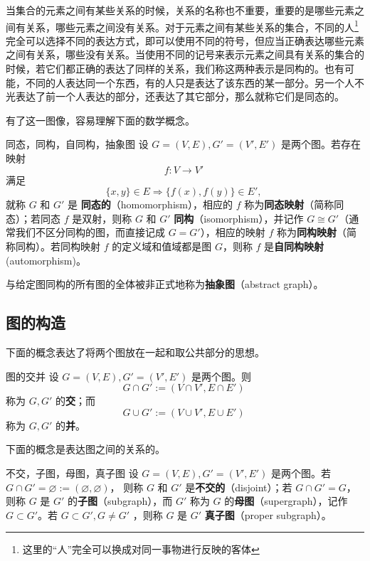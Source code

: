 当集合的元素之间有某些关系的时候，关系的名称也不重要，重要的是哪些元素之间有关系，哪些元素之间没有关系。对于元素之间有某些关系的集合，不同的人\footnote{这里的“人”完全可以换成对同一事物进行反映的客体}完全可以选择不同的表达方式，即可以使用不同的符号，但应当正确表达哪些元素之间有关系，哪些没有关系。当使用不同的记号来表示元素之间具有关系的集合的时候，若它们都正确的表达了同样的关系，我们称这两种表示是同构的。也有可能，不同的人表达同一个东西，有的人只是表达了该东西的某一部分。另一个人不光表达了前一个人表达的部分，还表达了其它部分，那么就称它们是同态的。

有了这一图像，容易理解下面的数学概念。
\begin{definition}{同态，同构，自同构，抽象图}
设 $G=(V,E),G'=(V',E')$ 是两个图。若存在映射
\begin{equation}
f:V\rightarrow V'~
\end{equation}
满足
\begin{equation}
\{x,y\}\in E\Rightarrow \{f(x),f(y)\}\in E',~
\end{equation}
就称 $G$ 和 $G'$ 是 \textbf{同态的}（homomorphism），相应的 $f$ 称为\textbf{同态映射}（简称同态）；若同态 $f$ 是双射，则称 $G$ 和 $G'$ \textbf{同构}（isomorphism），并记作 $G\cong G'$（通常我们不区分同构的图，而直接记成 $G=G'$），相应的映射 $f$ 称为\textbf{同构映射}（简称同构）。若同构映射 $f$ 的定义域和值域都是图 $G$，则称 $f$ 是\textbf{自同构映射}(automorphism)。

与给定图同构的所有图的全体被非正式地称为\textbf{抽象图}（abstract graph）。
\end{definition}


\subsection{图的构造}
下面的概念表达了将两个图放在一起和取公共部分的思想。

\begin{definition}{图的交并}
设 $G=(V,E),G'=(V',E')$ 是两个图。则
\begin{equation}
G\cap G':=(V\cap V',E\cap E')~
\end{equation}
称为 $G,G'$ 的\textbf{交}；而
\begin{equation}
G\cup G':=(V\cup V',E\cup E')~
\end{equation}
称为 $G,G'$ 的\textbf{并}。
\end{definition}

下面的概念是表达图之间的关系的。

\begin{definition}{不交，子图，母图，真子图}
设 $G=(V,E),G'=(V',E')$ 是两个图。若 $G\cap G'=\varnothing:=(\varnothing,\varnothing)$， 则称 $G$ 和 $G'$ 是\textbf{不交的}（disjoint）；若 $G\cap G'=G$，则称 $G$ 是 $G'$ 的\textbf{子图}（subgraph），而 $G'$ 称为 $G$ 的\textbf{母图}（supergraph），记作 $G\subset G'$。若 $G\subset G', G\neq G'$ ，则称 $G$ 是 $G'$ \textbf{真子图}（proper subgraph）。
\end{definition}

